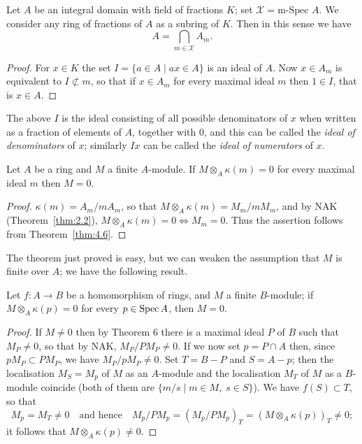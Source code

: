 \begin{theorem}\label{thm:4.7}
Let $A$ be an integral domain with field of fractions $K$; set
$\mathcal{X} = \text{m-Spec } A$. We consider any ring of fractions of $A$ as a subring of $K$.
Then in this sense we have
\[
  A = \bigcap_{m \in \mathcal{X}} A_m.
\]
\end{theorem}

\begin{proof}
For $x \in K$ the set $I = \{a \in A \mid ax \in A\}$ is an ideal of $A$. Now
$x \in A_m$ is equivalent to $I \not\subset m$, so that if $x \in A_m$ for every maximal ideal
$m$ then $1 \in I$, that is $x \in A$.
\end{proof}

\begin{remark}
The above $I$ is the ideal consisting of all possible denominators
of $x$ when written as a fraction of elements of $A$, together with $0$, and this
can be called the \emph{ideal of denominators} of $x$; similarly $Ix$ can be called
the \emph{ideal of numerators} of $x$.
\end{remark}

\begin{theorem}\label{thm:4.8}
Let $A$ be a ring and $M$ a finite $A$-module. If $M \otimes_A \kappa(m) = 0$
for every maximal ideal $m$ then $M = 0$.
\end{theorem}

\begin{proof}
$\kappa(m) = A_m/mA_m$, so that $M \otimes_A \kappa(m) = M_m/mM_m$, and by NAK
(Theorem~\ref{thm:2.2}), $M \otimes_A \kappa(m) = 0 \iff M_m = 0$. Thus the assertion follows from
Theorem~\ref{thm:4.6}.
\end{proof}

The theorem just proved is easy, but we can weaken the assumption
that $M$ is finite over $A$; we have the following result.

\begin{theorem}\label{thm:4.9}
Let $f\colon A \to B$ be a homomorphism of rings, and $M$ a finite
$B$-module; if $M \otimes_A \kappa(p) = 0$ for every $p \in \operatorname{Spec} A$, then $M = 0$.
\end{theorem}

\begin{proof}
If $M \neq 0$ then by Theorem 6 there is a maximal ideal $P$ of $B$ such
that $M_P \neq 0$, so that by NAK, $M_P/PM_P \neq 0$. If we now set $p = P \cap A$ then,
since $pM_P \subset PM_P$, we have $M_P/pM_P \neq 0$. Set $T = B - P$ and $S = A - p$;
then the localisation $M_S = M_p$ of $M$ as an $A$-module and the localisation
$M_T$ of $M$ as a $B$-module coincide (both of them are $\{m/s \mid m \in M, \; s \in S\}$).
We have $f(S) \subset T$, so that
\[
  M_p = M_T \neq 0 \quad \text{and hence} \quad M_p/PM_p = (M_p/PM_p)_T = (M \otimes_A \kappa(p))_T \neq 0;
\]
it follows that $M \otimes_A \kappa(p) \neq 0$.
\end{proof}

